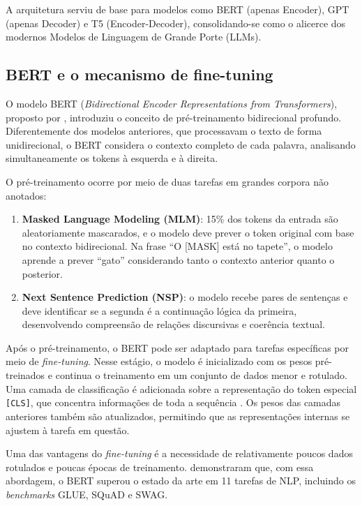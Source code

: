 \documentclass[
    12pt,                %
    openright,           %
    oneside,             %
    a4paper,             %
    english,             %
    brazil               %
]{abntex2}
\begin{document}
A arquitetura serviu de base para modelos como BERT (apenas Encoder), GPT (apenas Decoder) e T5 (Encoder-Decoder), consolidando-se como o alicerce dos modernos Modelos de Linguagem de Grande Porte (LLMs).


\subsection{BERT e o mecanismo de fine-tuning}

O modelo BERT (\textit{Bidirectional Encoder Representations from Transformers}), proposto por , introduziu o conceito de pré-treinamento bidirecional profundo. Diferentemente dos modelos anteriores, que processavam o texto de forma unidirecional, o BERT considera o contexto completo de cada palavra, analisando simultaneamente os tokens à esquerda e à direita.

O pré-treinamento ocorre por meio de duas tarefas em grandes corpora não anotados:

\begin{enumerate}
    \item \textbf{Masked Language Modeling (MLM)}: 15\% dos tokens da entrada são aleatoriamente mascarados, e o modelo deve prever o token original com base no contexto bidirecional. Na frase ``O [MASK] está no tapete'', o modelo aprende a prever ``gato'' considerando tanto o contexto anterior quanto o posterior.
    \item \textbf{Next Sentence Prediction (NSP)}: o modelo recebe pares de sentenças e deve identificar se a segunda é a continuação lógica da primeira, desenvolvendo compreensão de relações discursivas e coerência textual.
\end{enumerate}

Após o pré-treinamento, o BERT pode ser adaptado para tarefas específicas por meio de \textit{fine-tuning}. Nesse estágio, o modelo é inicializado com os pesos pré-treinados e continua o treinamento em um conjunto de dados menor e rotulado. Uma camada de classificação é adicionada sobre a representação do token especial \texttt{[CLS]}, que concentra informações de toda a sequência \cite{Devlin2019}. Os pesos das camadas anteriores também são atualizados, permitindo que as representações internas se ajustem à tarefa em questão.

Uma das vantagens do \textit{fine-tuning} é a necessidade de relativamente poucos dados rotulados e poucas épocas de treinamento.  demonstraram que, com essa abordagem, o BERT superou o estado da arte em 11 tarefas de NLP, incluindo os \textit{benchmarks} GLUE, SQuAD e SWAG.
\end{document}

